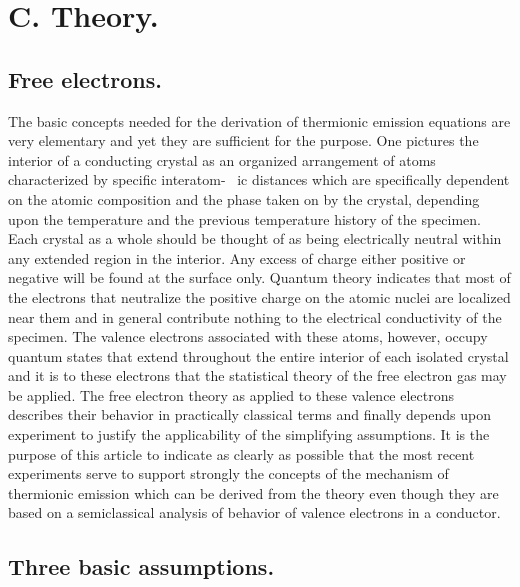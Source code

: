 \documentclass[11pt,a4paper]{article}
\begin{document}
	\section{C. Theory.}
	
	\subsection{Free electrons.}
	
	The basic concepts needed for the derivation of thermionic
	emission equations are very elementary and yet they are sufficient for the
	purpose. One pictures the interior of a conducting crystal as an organized arrangement of atoms characterized by specific interatom- \ ic distances which are specifically dependent on the atomic composition and the phase taken on by the crystal,
	depending upon the temperature and the previous temperature history of the
	specimen. Each crystal as a whole should be thought of as being electrically
	neutral within any extended region in the interior. Any excess of charge either
	positive or negative will be found at the surface only. Quantum theory indicates
	that most of the electrons that neutralize the positive charge on the atomic
	nuclei are localized near them and in general contribute nothing to the electrical
	conductivity of the specimen. The valence electrons associated with these
	atoms, however, occupy quantum states that extend throughout the entire interior of each isolated crystal and it is to these electrons that the statistical
	theory of the free electron gas may be applied. The free electron theory as applied
	to these valence electrons describes their behavior in practically classical terms
	and finally depends upon experiment to justify the applicability of the simplifying assumptions. It is the purpose of this article to indicate as clearly as possible
	that the most recent experiments serve to support strongly the concepts of the
	mechanism of thermionic emission which can be derived from the theory even
	though they are based on a semiclassical analysis of behavior of valence electrons
	in a conductor.
	
	\subsection{Three basic assumptions.}
	
\end{document}
